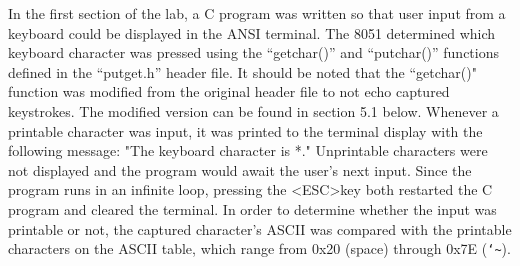 \documentclass[12pt]{article}
\begin{document}
In the first section of the lab, a C program was written so that user input from a keyboard could be displayed in the ANSI terminal. The 8051 determined which keyboard character was pressed using the ``getchar()'' and ``putchar()'' functions defined in the ``putget.h'' header file. It should be noted that the ``getchar()" function was modified from the original header file to not echo captured keystrokes. The modified version can be found in section 5.1 below. Whenever a printable character was input, it was printed to the terminal display with the following message: "The keyboard character is *."  Unprintable characters were not displayed and the program would await the user's next input. Since the program runs in an infinite loop, pressing the \textless ESC\textgreater key both restarted the C program and cleared the terminal. In order to determine whether the input was printable or not, the captured character's ASCII was compared with the printable characters on the ASCII table, which range from 0x20 (space) through 0x7E (\texttt{\char`\~}).
\end{document}
